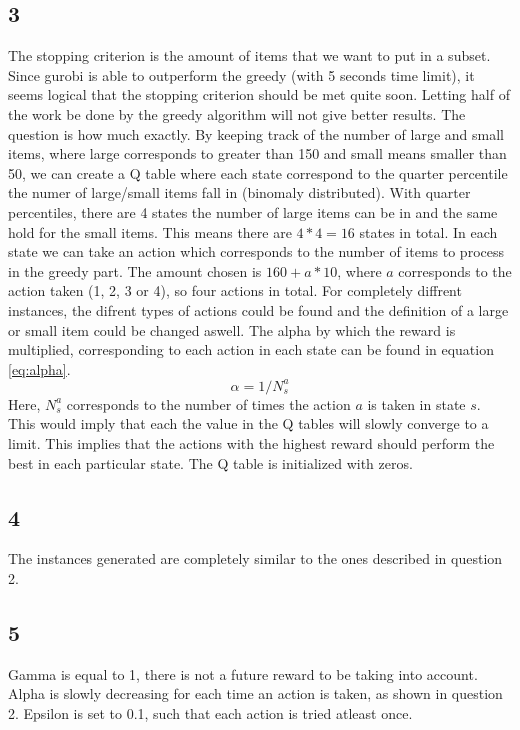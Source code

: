 \subsection*{3}
The stopping criterion is the amount of items that we want to put in a subset. Since gurobi is able to outperform the greedy (with 5 seconds time limit), it seems logical that the stopping criterion should be met quite soon. Letting half of the work be done by the greedy algorithm will not give better results. The question is how much exactly. By keeping track of the number of large and small items, where large corresponds to greater than 150 and small means smaller than 50, we can create a Q table where each state correspond to the quarter percentile the numer of large/small items fall in (binomaly distributed). With quarter percentiles, there are 4 states the number of large items can be in and the same hold for the small items. This means there are $4 * 4 = 16$ states in total. In each state we can take an action which corresponds to the number of items to process in the greedy part. The amount chosen is $160 + a * 10$, where $a$ corresponds to the action taken (1, 2, 3 or 4), so four actions in total. For completely diffrent instances, the difrent types of actions could be found and the definition of a large or small item could be changed aswell. The alpha by which the reward is multiplied, corresponding to each action in each state can be found in equation \ref{eq:alpha}.
\begin{equation}
	\alpha = 1 / N_s^a
	\label{eq:alpha}
\end{equation}
Here, $N_s^a$ corresponds to the number of times the action $a$ is taken in state $s$. This would imply that each the value in the Q tables will slowly converge to a limit. This implies that the actions with the highest reward should perform the best in each particular state. The Q table is initialized with zeros.
\subsection*{4}
The instances generated are completely similar to the ones described in question 2.
\subsection*{5}
Gamma is equal to 1, there is not a future reward to be taking into account. Alpha is slowly decreasing for each time an action is taken, as shown in question 2. Epsilon is set to 0.1, such that each action is tried atleast once.
